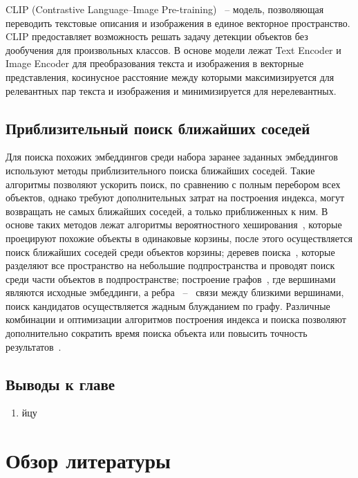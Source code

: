 \documentclass[a4paper,14pt]{article}
\begin{document}
    CLIP (Contrastive Language–Image Pre-training)~\cite{CLIP} -- модель, позволяющая переводить текстовые описания и изображения в единое векторное пространство.
    CLIP предоставляет возможность решать задачу детекции объектов без дообучения для произвольных классов.
    В основе модели лежат Text Encoder и Image Encoder для преобразования текста и изображения в векторные представления, косинусное расстояние между которыми максимизируется для релевантных пар текста и изображения и минимизируется для нерелевантных.
    
    \subsection{Приблизительный поиск ближайших соседей}
    
    Для поиска похожих эмбеддингов среди набора заранее заданных эмбеддингов используют методы приблизительного поиска ближайших соседей.
    Такие алгоритмы позволяют ускорить поиск, по сравнению с полным перебором всех объектов, однако требуют дополнительных затрат на построения индекса, 
    могут возвращать не самых ближайших соседей, а только приближенных к ним.
    В основе таких методов лежат алгоритмы вероятностного хеширования~\cite{tao2010efficient}, которые проецируют похожие объекты в одинаковые корзины, после этого осуществляется поиск ближайших соседей среди объектов корзины;
    деревев поиска~\cite{liu2006new}, которые разделяют все пространство на небольшие подпространства и проводят поиск среди части объектов в подпространстве;
    построение графов~\cite{malkov2018efficient}, где вершинами являются исходные эмбеддинги, а 
    ребра ~--~ связи между близкими вершинами, поиск кандидатов осуществляется жадным блужданием по графу.
    Различные комбинации и оптимизации алгоритмов построения индекса и поиска позволяют дополнительно сократить время поиска объекта или повысить точность результатов~\cite{annoy,avq_2020}.
    
    \subsection{Выводы к главе \thesection}
    \begin{enumerate}
    	[1)]
    	\itemsep0em
    	\item йцу
    \end{enumerate}
    
    \newpage
    
 	\section{Обзор литературы}
\end{document}
